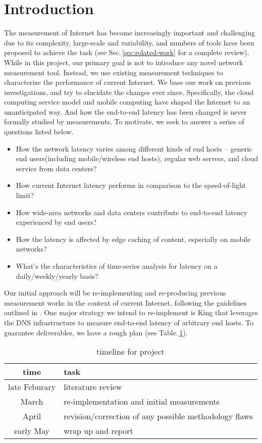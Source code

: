 \section{Introduction}
\label{sec:introduction}

The measurement of Internet has become increasingly important and challenging due to its complexity, large-scale and variability, and numbers of tools have been proposed to achieve the task (see Sec.\,\ref{sec:related-work} for a complete review). While in this project, our primary goal is not to introduce any novel network measurement tool. Instead, we use existing measurement techniques to characterize the performance of current Internet. We base our work on previous investigations, and try to elucidate the changes ever since. Specifically, the cloud computing service model and mobile computing have shaped the Internet to an unanticipated way. And how the end-to-end latency has been changed is never formally studied by measurements. To motivate, we seek to answer a series of questions listed below.

\begin{itemize}
\item How the network latency varies among different kinds of end hosts -- generic end users(including mobile/wireless end hosts), regular web servers, and cloud service from data centers?
\item How current Internet latency performs in comparison to the speed-of-light limit?
\item How wide-area networks and data centers contribute to end-to-end latency experienced by end users?
\item How the latency is affected by edge caching of content, especially on mobile networks?
\item What's the characteristics of time-series analysis for latency on a daily/weekly/yearly basis?
\end{itemize}

Our initial approach will be re-implementing and re-producing previous measurement works in the context of current Internet, following the guidelines outlined in \cite{paxson2004strategies}. One major strategy we intend to re-implement is King \cite{gummadi2002king} that leverages the DNS infrastructure to measure end-to-end latency of arbitrary end hosts. To guarantee deliverables, we have a rough plan (see Table.\,\ref{tab:plan}).

\begin{table}
  \centering
  \begin{tabular}{ c|p{4cm} }
    \hline
    time & task \\
    \hline
    late Feburary & literature review \\
    March & re-implementation and initial measurements \\
    April & revision/correction of any possible methodology flaws \\
    early May & wrap up and report \\ 
    \hline
  \end{tabular}
  \label{tab:plan}
  \caption{timeline for project}
\end{table}

